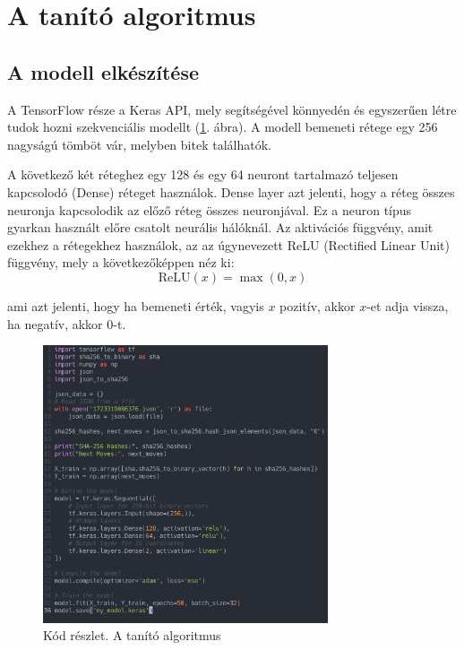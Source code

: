 \section{A tanító algoritmus}

\subsection{A modell elkészítése}
A TensorFlow része a Keras API, mely segítségével könnyedén és egyszerűen létre tudok hozni szekvenciális modellt (\ref{code:tensor}. ábra). A modell bemeneti rétege egy 256 nagyságú tömböt vár, melyben bitek találhatók. 

A következő két réteghez egy 128 és egy 64 neuront tartalmazó teljesen kapcsolodó (Dense) réteget használok. Dense layer azt jelenti, hogy a réteg összes neuronja kapcsolodik az előző réteg összes neuronjával. Ez a neuron típus gyarkan használt előre csatolt neurális hálóknál.
Az aktivációs függvény, amit ezekhez a rétegekhez használok, az az úgynevezett 
ReLU (Rectified Linear Unit) függvény, mely a következőképpen néz ki:
\begin{equation}\label{eq:2}
\text{ReLU}(x) = \max(0, x) 
\end{equation}

ami azt jelenti, hogy ha bemeneti érték, vagyis $x$ pozitív, akkor $x$-et adja vissza, ha negatív, akkor 0-t. 


\begin{figure}[h]
    \center
    \includegraphics[width=0.75\textwidth]{img/Tensor.png}
    \caption{Kód részlet. A tanító algoritmus}
    \label{code:tensor}
\end{figure}

